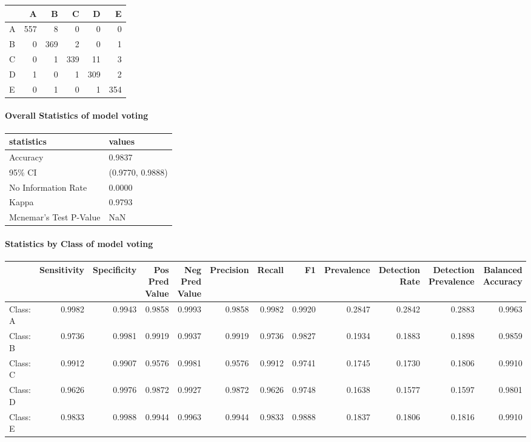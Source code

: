 \documentclass[]{article}
\let\oldparagraph\paragraph
\renewcommand{\paragraph}[1]{\oldparagraph{#1}\mbox{}}
\begin{document}
\begin{table}[H]
\centering
\begin{tabular}{l|r|r|r|r|r}
\hline
  & A & B & C & D & E\\
\hline
A & 557 & 8 & 0 & 0 & 0\\
\hline
B & 0 & 369 & 2 & 0 & 1\\
\hline
C & 0 & 1 & 339 & 11 & 3\\
\hline
D & 1 & 0 & 1 & 309 & 2\\
\hline
E & 0 & 1 & 0 & 1 & 354\\
\hline
\end{tabular}
\end{table}

\paragraph{Overall Statistics of model
voting}\label{overall-statistics-of-model-voting}

\begin{table}[H]
\centering
\begin{tabular}{l|l}
\hline
statistics & values\\
\hline
Accuracy & 0.9837\\
\hline
95\% CI & (0.9770, 0.9888)\\
\hline
No Information Rate & 0.0000\\
\hline
Kappa & 0.9793\\
\hline
Mcnemar's Test P-Value & NaN\\
\hline
\end{tabular}
\end{table}

\paragraph{Statistics by Class of model
voting}\label{statistics-by-class-of-model-voting}

\begingroup\fontsize{11}{13}\selectfont

\begin{tabular}{l|r|r|r|r|r|r|r|r|r|r|r}
\hline
  & Sensitivity & Specificity & Pos Pred Value & Neg Pred Value & Precision & Recall & F1 & Prevalence & Detection Rate & Detection Prevalence & Balanced Accuracy\\
\hline
Class: A & 0.9982 & 0.9943 & 0.9858 & 0.9993 & 0.9858 & 0.9982 & 0.9920 & 0.2847 & 0.2842 & 0.2883 & 0.9963\\
\hline
Class: B & 0.9736 & 0.9981 & 0.9919 & 0.9937 & 0.9919 & 0.9736 & 0.9827 & 0.1934 & 0.1883 & 0.1898 & 0.9859\\
\hline
Class: C & 0.9912 & 0.9907 & 0.9576 & 0.9981 & 0.9576 & 0.9912 & 0.9741 & 0.1745 & 0.1730 & 0.1806 & 0.9910\\
\hline
Class: D & 0.9626 & 0.9976 & 0.9872 & 0.9927 & 0.9872 & 0.9626 & 0.9748 & 0.1638 & 0.1577 & 0.1597 & 0.9801\\
\hline
Class: E & 0.9833 & 0.9988 & 0.9944 & 0.9963 & 0.9944 & 0.9833 & 0.9888 & 0.1837 & 0.1806 & 0.1816 & 0.9910\\
\hline
\end{tabular}
\end{document}
